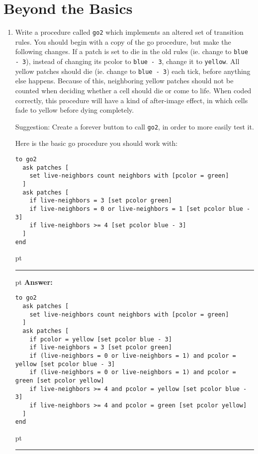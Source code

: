 \documentclass[11pt]{book}
\begin{document}
\section{Beyond the Basics}
\begin{enumerate}

\item Write a procedure called \texttt{go2} which implements an altered set of transition rules. You should begin with a copy of the go procedure, but make the following changes. If a patch is set to die in the old rules (ie. change to \texttt{blue - 3}), instead of changing its pcolor to \texttt{blue - 3}, change it to \texttt{yellow}. All yellow patches should die (ie. change to \texttt{blue - 3}) each tick, before anything else happens. Because of this, neighboring yellow patches should not be counted when deciding whether a cell should die or come to life. When coded correctly, this procedure will have a kind of after-image effect, in which cells fade to yellow before dying completely.

Suggestion: Create a forever button to call \texttt{go2}, in order to more easily test it.

Here is the basic go procedure you should work with:
\begin{verbatim}
to go2
  ask patches [
    set live-neighbors count neighbors with [pcolor = green]
  ]
  ask patches [
    if live-neighbors = 3 [set pcolor green]
    if live-neighbors = 0 or live-neighbors = 1 [set pcolor blue - 3]
    if live-neighbors >= 4 [set pcolor blue - 3]
  ]
end
\end{verbatim}

\ifnum{}
 pt
\hrule
{} pt
{\bf Answer: }
\begin{verbatim}
to go2
  ask patches [
    set live-neighbors count neighbors with [pcolor = green]
  ]
  ask patches [
    if pcolor = yellow [set pcolor blue - 3]
    if live-neighbors = 3 [set pcolor green]
    if (live-neighbors = 0 or live-neighbors = 1) and pcolor = yellow [set pcolor blue - 3]
    if (live-neighbors = 0 or live-neighbors = 1) and pcolor = green [set pcolor yellow]
    if live-neighbors >= 4 and pcolor = yellow [set pcolor blue - 3]
    if live-neighbors >= 4 and pcolor = green [set pcolor yellow]
  ]
end
\end{verbatim}
 pt
\hrule
\fi


\end{enumerate}
\end{document}
